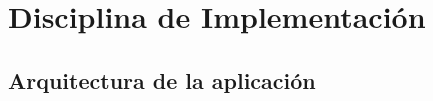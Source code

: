 
\chapter{Disciplina de Implementación}
\label{chap:implementacion}



\section{Arquitectura de la aplicación}

